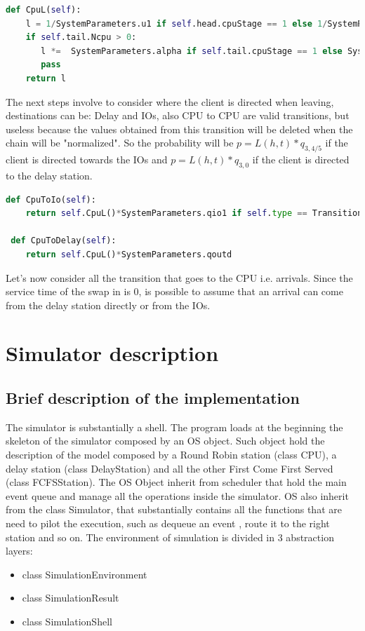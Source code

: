 \documentclass[12pt,a4paper]{article}
\begin{document}
\begin{lstlisting}[language=python]
def CpuL(self):
    l = 1/SystemParameters.u1 if self.head.cpuStage == 1 else 1/SystemParameters.u2
    if self.tail.Ncpu > 0:
       l *=  SystemParameters.alpha if self.tail.cpuStage == 1 else SystemParameters.beta
       pass
    return l
\end{lstlisting}

The next steps involve to consider where the client is directed when leaving, destinations can be: Delay and IOs, also CPU to CPU are valid transitions, but useless because the values obtained from this transition will be deleted when the chain will be "normalized". So the probability will be $p=L(h,t)*q_{3,4/5}$ if the client is directed towards the IOs and $p=L(h,t)*q_{3,0}$ if the client is directed to the delay station. 

\begin{lstlisting}[language=python]
 def CpuToIo(self):      
    return self.CpuL()*SystemParameters.qio1 if self.type == Transition.TransitionType.CPU_TO_IO1 else self.CpuL()*SystemParameters.qio2
 
 def CpuToDelay(self):
    return self.CpuL()*SystemParameters.qoutd
\end{lstlisting}

Let's now consider all the transition that goes to the CPU i.e. arrivals. Since the service time of the swap in is 0, is possible to assume that an arrival can come from the delay station directly or from the IOs. 
\section{Simulator description}
\subsection{Brief description of the implementation}
The simulator is substantially a shell. The program loads at the beginning the skeleton of the simulator composed by an OS object. Such object hold the description of the model composed by a Round Robin station (class CPU), a delay station (class DelayStation) and all the other First Come First Served (class FCFSStation). The OS Object inherit from scheduler that hold the main event queue and manage all the operations inside the simulator. OS also inherit from the class Simulator, that substantially contains all the functions that are need to pilot the execution, such as dequeue an event , route it to the right station and so on. The environment of simulation is divided in 3 abstraction layers:
\begin{itemize}
    \item class SimulationEnvironment
    \item class SimulationResult
    \item class SimulationShell
\end{itemize}
\end{document}
